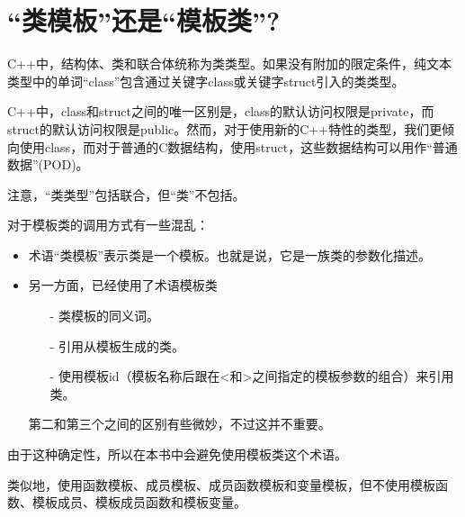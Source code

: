 \section{“类模板”还是“模板类”?}
C++中，结构体、类和联合体统称为类类型。如果没有附加的限定条件，纯文本类型中的单词“class”包含通过关键字class或关键字struct引入的类类型。

\begin{notice}
C++中，class和struct之间的唯一区别是，class的默认访问权限是private，而struct的默认访问权限是public。然而，对于使用新的C++特性的类型，我们更倾向使用class，而对于普通的C数据结构，使用struct，这些数据结构可以用作“普通数据”(POD)。
\end{notice}

注意，“类类型”包括联合，但“类”不包括。

对于模板类的调用方式有一些混乱：

\begin{itemize}
\item 
术语“类模板”表示类是一个模板。也就是说，它是一族类的参数化描述。

\item 
另一方面，已经使用了术语模板类
\begin{itemize}
\item[-]
类模板的同义词。

\item[-]
引用从模板生成的类。

\item[-]
使用模板id（模板名称后跟在<和>之间指定的模板参数的组合）来引用类。
\end{itemize}

第二和第三个之间的区别有些微妙，不过这并不重要。
\end{itemize}

由于这种确定性，所以在本书中会避免使用模板类这个术语。

类似地，使用函数模板、成员模板、成员函数模板和变量模板，但不使用模板函数、模板成员、模板成员函数和模板变量。

















